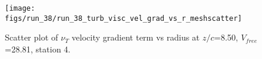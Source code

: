 \begin{figure}[H]
\centering
\texttt{[image: figs/run\_38/run\_38\_turb\_visc\_vel\_grad\_vs\_r\_meshscatter]}
\caption{Scatter plot of $\nu_T$ velocity gradient term vs radius at $z/c$=8.50, $V_{free}$=28.81, station 4.}
\label{fig:run_38_turb_visc_vel_grad_vs_r_meshscatter}
\end{figure}


